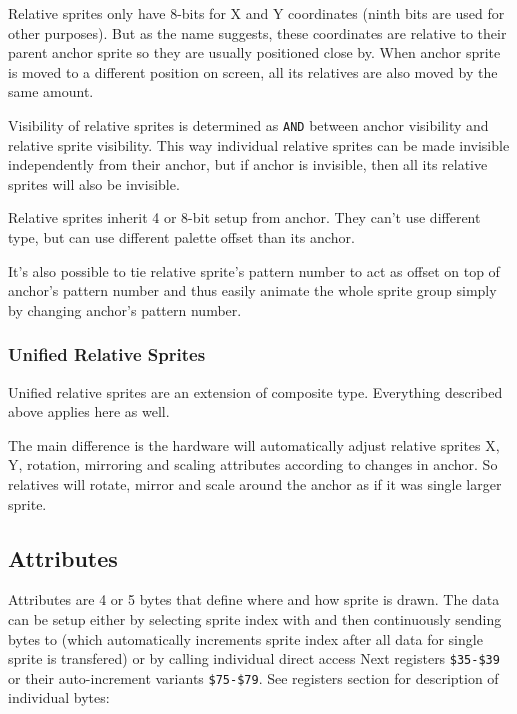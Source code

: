 Relative sprites only have 8-bits for X and Y coordinates (ninth bits are used for other purposes). But as the name suggests, these coordinates are relative to their parent anchor sprite so they are usually positioned close by. When anchor sprite is moved to a different position on screen, all its relatives are also moved by the same amount.

Visibility of relative sprites is determined as {\tt AND} between anchor visibility and relative sprite visibility. This way individual relative sprites can be made invisible independently from their anchor, but if anchor is invisible, then all its relative sprites will also be invisible.

Relative sprites inherit 4 or 8-bit setup from anchor. They can't use different type, but can use different palette offset than its anchor.

It's also possible to tie relative sprite's pattern number to act as offset on top of anchor's pattern number and thus easily animate the whole sprite group simply by changing anchor's pattern number.

\subsubsection{Unified Relative Sprites}

Unified relative sprites are an extension of composite type. Everything described above applies here as well.

The main difference is the hardware will automatically adjust relative sprites X, Y, rotation, mirroring and scaling attributes according to changes in anchor. So relatives will rotate, mirror and scale around the anchor as if it was single larger sprite.

\subsection{Attributes}

Attributes are 4 or 5 bytes that define where and how sprite is drawn. The data can be setup either by selecting sprite index with  and then continuously sending bytes to  (which automatically increments sprite index after all data for single sprite is transfered) or by calling individual direct access Next registers {\tt \$35-\$39} or their auto-increment variants {\tt \$75-\$79}. See registers section for description of individual bytes:

